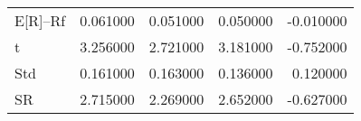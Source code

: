 \begin{tabular}{lrrrr}
\toprule
\midrule
E[R]--Rf & 0.061000 & 0.051000 & 0.050000 & -0.010000 \\
t & 3.256000 & 2.721000 & 3.181000 & -0.752000 \\
Std & 0.161000 & 0.163000 & 0.136000 & 0.120000 \\
SR & 2.715000 & 2.269000 & 2.652000 & -0.627000 \\
\bottomrule
\end{tabular}
